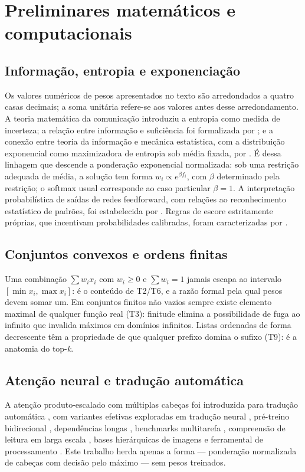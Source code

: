 \documentclass[12pt,openany,oneside,a4paper,brazil,chapter=TITLE]{abntex2}
\let\cite\citep
\begin{document}


\chapter{Preliminares matemáticos e computacionais}\label{cap:preliminares}
\section{Informação, entropia e exponenciação}
Os valores numéricos de pesos apresentados no texto são arredondados a quatro casas decimais; a soma unitária refere-se aos valores antes desse arredondamento.
A teoria matemática da comunicação \cite{shannon1948} introduziu a entropia como medida de incerteza; a relação entre informação e suficiência foi formalizada por \citet{kullback1951}; e a conexão entre teoria da informação e mecânica estatística, com a distribuição exponencial como maximizadora de entropia sob média fixada, por \citet{jaynes1957}. É dessa linhagem que descende a ponderação exponencial normalizada: sob uma restrição adequada de média, a solução tem forma $w_i\propto e^{\beta f_i}$, com $\beta$ determinado pela restrição; o softmax usual corresponde ao caso particular $\beta=1$. A interpretação probabilística de saídas de redes feedforward, com relações ao reconhecimento estatístico de padrões, foi estabelecida por \citet{bridle1990}. Regras de escore estritamente próprias, que incentivam probabilidades calibradas, foram caracterizadas por \citet{gneiting2007}.
\section{Conjuntos convexos e ordens finitas}
Uma combinação $\sum w_ix_i$ com $w_i\geq0$ e $\sum w_i=1$ jamais escapa ao intervalo $[\min x_i,\max x_i]$: é o conteúdo de T2/T6, e a razão formal pela qual pesos devem somar um. Em conjuntos finitos não vazios sempre existe elemento maximal de qualquer função real (T3): finitude elimina a possibilidade de fuga ao infinito que invalida máximos em domínios infinitos. Listas ordenadas de forma decrescente têm a propriedade de que qualquer prefixo domina o sufixo (T9): é a anatomia do top-\textit{k}.
\section{Atenção neural e tradução automática}
A atenção produto-escalado com múltiplas cabeças foi introduzida para tradução automática \cite{vaswani2017}, com variantes efetivas exploradas em tradução neural \cite{luong2015}, pré-treino bidirecional \cite{devlin2019}, dependências longas \cite{dai2019}, benchmarks multitarefa \cite{wang2018}, compreensão de leitura em larga escala \cite{rajpurkar2016}, bases hierárquicas de imagens \cite{deng2009} e ferramental de processamento \cite{wolf2020}. Este trabalho herda apenas a forma --- ponderação normalizada de cabeças com decisão pelo máximo --- sem pesos treinados.
\end{document}
